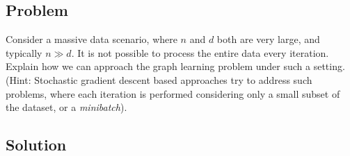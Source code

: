 \documentclass[a4paper]{article}
\begin{document}
\subsection{Problem}

Consider a massive data scenario, where $n$ and $d$ both are very large, and typically $n \gg d$. It is not possible to process the entire data every iteration. Explain how we can approach
the graph learning problem under such a setting. (Hint: Stochastic gradient descent based approaches try to address such problems, where each iteration is performed considering only a small
subset of the dataset, or a \emph{minibatch}).

\subsection{Solution}
\end{document}
